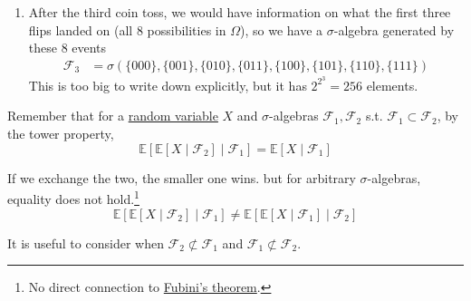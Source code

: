 \begin{example}
\begin{enumerate}
      \item After the third coin toss, we would have information on what the first three flips landed on (all 8 possibilities in $\Omega$), so we have a $\sigma$-algebra generated by these 8 events 
      \begin{align}
        \mathcal{F}_3 & = \sigma(\{000\}, \{001\}, \{010\}, \{011\}, \{100\}, \{101\}, \{110\}, \{111\})
      \end{align}
      This is too big to write down explicitly, but it has $2^{2^3} = 256$ elements. 
    \end{enumerate}
  \end{example}


	Remember that for a \hyperref[def:random-variable]{random variable} $X$ and $\sigma$-algebras $\mathscr{F}_1, \mathscr{F}_2$ s.t. $\mathscr{F}_1 \subset \mathscr{F}_2$, by the tower property, 
	\begin{equation}
		\mathbb{E}[ \mathbb{E}[X \mid \mathscr{F}_2] \mid \mathscr{F}_1] = \mathbb{E}[X \mid \mathscr{F}_1] 
	\end{equation}

	If we exchange the two, the smaller one wins. but for arbitrary $\sigma$-algebras, equality does not hold.\footnote{No direct connection to \hyperref[mt-thm:fubinis-theorem]{Fubini's theorem}.}
	\begin{equation}
		\mathbb{E}[ \mathbb{E}[X \mid \mathscr{F}_2] \mid \mathscr{F}_1] \neq \mathbb{E}[ \mathbb{E}[X \mid \mathscr{F}_1] \mid \mathscr{F}_2]
	\end{equation}

	It is useful to consider when $\mathscr{F}_2 \not\subset \mathscr{F}_1$ and $\mathscr{F}_1 \not\subset \mathscr{F}_2$. 

